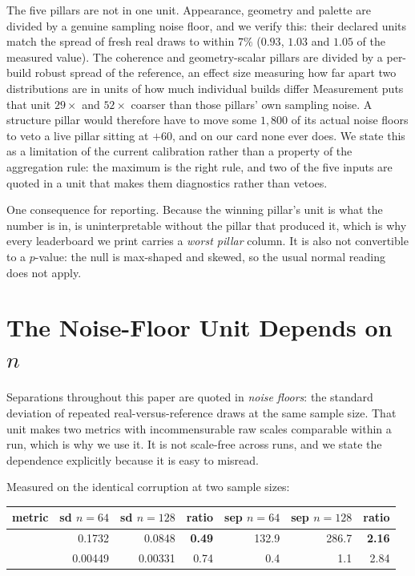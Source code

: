 The five pillars are not in one unit. Appearance, geometry and palette are
divided by a genuine sampling noise floor, and we verify this: their declared
units match the spread of fresh real draws to within $7\%$ ($0.93$, $1.03$ and
$1.05$ of the measured value). The coherence and geometry-scalar pillars are
divided by a per-build robust spread of the reference, an effect size measuring how
far apart two distributions are in units of how much individual builds differ
Measurement puts that unit $29\times$ and $52\times$ coarser than those
pillars' own sampling noise. A structure pillar would therefore have to move
some $1{,}800$ of its actual noise floors to veto a live pillar sitting at
$+60$, and on our card none ever does. We state this as a limitation of the
current calibration rather than a property of the aggregation rule: the maximum
is the right rule, and two of the five inputs are quoted in a unit that makes
them diagnostics rather than vetoes.

One consequence for reporting. Because the winning pillar's unit is what the
number is in, \blockscore{} is uninterpretable without the pillar that produced
it, which is why every leaderboard we print carries a \emph{worst pillar}
column. It is also not convertible to a $p$-value: the null is max-shaped and
skewed, so the usual normal reading does not apply.

\section{The Noise-Floor Unit Depends on $n$}
\label{app:nscale}

Separations throughout this paper are quoted in \emph{noise floors}: the
standard deviation of repeated real-versus-reference draws at the same sample
size. That unit makes two metrics with incommensurable raw scales comparable
within a run, which is why we use it. It is not scale-free across runs,
and we state the dependence explicitly because it is easy to misread.

Measured on the identical corruption at two sample sizes:

\begin{center}
\small
\begin{tabular}{lrrrrrr}
\toprule
metric & sd $n{=}64$ & sd $n{=}128$ & ratio & sep $n{=}64$ & sep $n{=}128$ & ratio \\
\midrule
\vkid{} & 0.1732 & 0.0848 & \textbf{0.49} & 132.9 & 286.7 & \textbf{2.16} \\
\mvkid{} & 0.00449 & 0.00331 & 0.74 & 0.4 & 1.1 & 2.84 \\
\bottomrule
\end{tabular}
\end{center}

